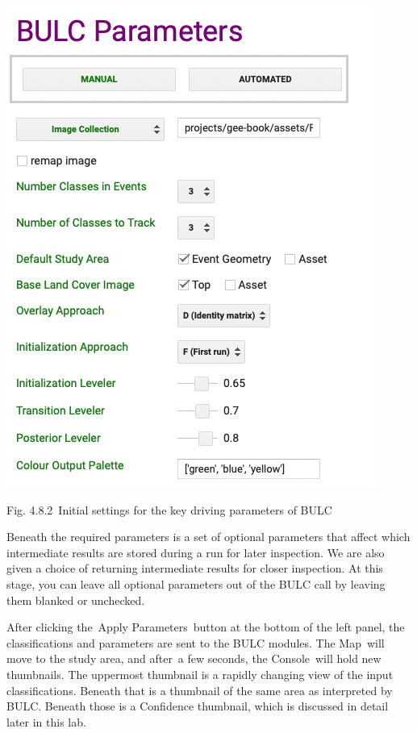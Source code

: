 \documentclass[
  letterpaper,
  DIV=11,
  numbers=noendperiod]{scrreprt}
\begin{document}
\includegraphics{./F4/image62.png}

Fig. 4.8.2~Initial settings for the key driving parameters of BULC~

Beneath the required parameters is a set of optional parameters that
affect which intermediate results are stored during a run for later
inspection. We are also given a choice of returning intermediate results
for closer inspection. At this stage, you can leave all optional
parameters out of the BULC call by leaving them blanked or unchecked.

After clicking the~Apply Parameters~button at the bottom of the left
panel, the classifications and parameters are sent to the BULC modules.
The Map~will move to the study area, and after~a few seconds, the
Console~will hold new thumbnails. The uppermost thumbnail is a rapidly
changing view of the input classifications. Beneath that is a thumbnail
of the same area as interpreted by BULC. Beneath those is a Confidence
thumbnail, which is discussed in detail later in this lab.
\end{document}
